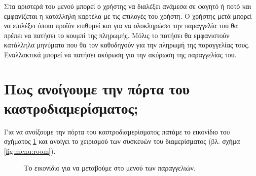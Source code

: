 \documentclass[a4paper,titlepage,twoside,12pt,leqno]{article}
\begin{document}
Στα αριστερά του μενού μπορεί ο χρήστης να διαλέξει ανάμεσα σε φαγητό ή ποτό και εμφανίζεται η κατάλληλη καρτέλα με τις επιλογές του χρήστη. Ο χρήστης μετά μπορεί να επιλέξει όποιο προϊόν επιθυμεί και για να ολοκληρώσει την παραγγελία του θα πρέπει να πατήσει το κουμπί της πληρωμής. Μόλις το πατήσει θα εμφανιστούν κατάλληλα μηνύματα που θα τον καθοδηγούν για την πληρωμή της παραγγελίας τους. Εναλλακτικά μπορεί να πατήσει ακύρωση για την ακύρωση της παραγγελίας του.


\section{Πως ανοίγουμε την πόρτα του καστροδιαμερίσματος;}

Για να ανοίξουμε την πόρτα του καστροδιαμερίσματος πατάμε το εικονίδιο του σχήματος \ref{fig:icon:room} και ανοίγει το χειρισμού των συσκευών του διαμερίσματος (βλ. σχήμα \ref{fig:menu:room}).

\begin{figure}
\begin{center}
\caption{Το εικονίδιο για να μεταβούμε στο μενού των παραγγελιών.}
\label{fig:icon:room}
\end{center}
\end{figure}
\end{document}
